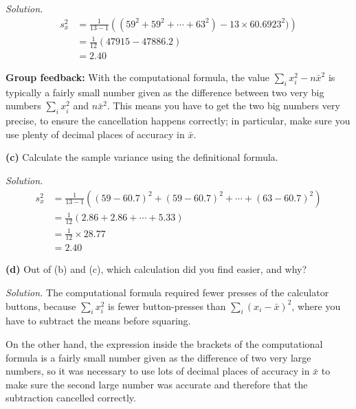 \documentclass[
  a4paper,
]{book}
\theoremstyle{definition}
\theoremstyle{definition}
\theoremstyle{definition}
\theoremstyle{definition}
\theoremstyle{remark}
\begin{document}
\begin{myanswers}
\emph{Solution.}
\begin{align*}
  s_x^2 &= \frac{1}{13 - 1} \left( (59^2 + 59^2 + \cdots + 63^2) - 13 \times 60.6923^2)\right) \\
        &= \frac{1}{12} (47915 - 47886.2) \\
        &= 2.40
\end{align*}

\textbf{Group feedback:} With the computational formula, the value \(\sum_i x_i^2 - n \bar{x}^2\) is typically a fairly small number given as the difference between two very big numbers \(\sum_i x_i^2\) and \(n \bar x^2\). This means you have to get the two big numbers very precise, to ensure the cancellation happens correctly; in particular, make sure you use plenty of decimal places of accuracy in \(\bar x\).

\end{myanswers}

\textbf{(c)} Calculate the sample variance using the definitional formula.

\begin{myanswers}
\emph{Solution.}
\begin{align*}
  s_x^2 &= \frac{1}{13 - 1} \left( (59 - 60.7)^2 + (59 - 60.7)^2 + \cdots + (63 - 60.7)^2 \right) \\
        &= \frac{1}{12} (2.86 + 2.86 + \cdots + 5.33) \\
        &= \frac{1}{12} \times 28.77 \\
        &= 2.40
\end{align*}

\end{myanswers}

\textbf{(d)} Out of (b) and (c), which calculation did you find easier, and why?

\begin{myanswers}
\emph{Solution.}
The computational formula required fewer presses of the calculator buttons, because \(\sum_i x_i^2\) is fewer button-presses than \(\sum_i (x_i - \bar x)^2\), where you have to subtract the means before squaring.

On the other hand, the expression inside the brackets of the computational formula is a fairly small number given as the difference of two very large numbers, so it was necessary to use lots of decimal places of accuracy in \(\bar x\) to make sure the second large number was accurate and therefore that the subtraction cancelled correctly.

\end{myanswers}
\end{document}
